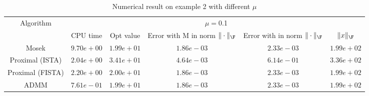 \begin{table}
\centering
\begin{tabular}{|c|c|c|c|c|c|}

\hline
\multirow{2}{*}{ Algorithm} &\multicolumn{5}{c|}{$\mu=$0.1}\\\cline{2-6}
 &CPU time &Opt value &Error with M in norm $\|\cdot\|_\F$ &Error with in norm $\|\cdot\|_\F$ &$\|x\|_\F$\\\hline
Mosek & $9.70e+00$ & $1.99e+01$ & $1.86e-03$ & $2.33e-03$ & $1.99e+02$\\\hline
Proximal (ISTA) & $2.04e+00$ & $3.41e+01$ & $4.64e-03$ & $6.14e-01$ & $3.36e+02$\\\hline
Proximal (FISTA) & $2.20e+00$ & $2.00e+01$ & $1.86e-03$ & $2.33e-03$ & $1.99e+02$\\\hline
ADMM & $7.61e-01$ & $1.99e+01$ & $1.86e-03$ & $2.33e-03$ & $1.99e+02$\\\hline
\end{tabular}
\caption{Numerical result on example 2 with different $\mu$\label{example2}}
\end{table}
